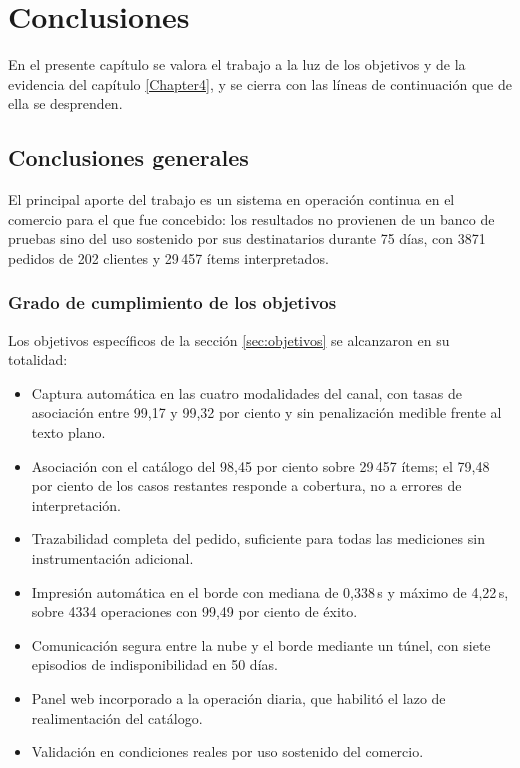 
\chapter{Conclusiones} %

\label{Chapter5}

En el presente capítulo se valora el trabajo a la luz de los objetivos y de la evidencia del capítulo \ref{Chapter4}, y se cierra con las líneas de continuación que de ella se desprenden.


\section{Conclusiones generales}

El principal aporte del trabajo es un sistema en operación continua en el comercio para el que fue concebido: los resultados no provienen de un banco de pruebas sino del uso sostenido por sus destinatarios durante 75 días, con 3871 pedidos de 202 clientes y 29\,457 ítems interpretados.

\subsection{Grado de cumplimiento de los objetivos}

Los objetivos específicos de la sección \ref{sec:objetivos} se alcanzaron en su totalidad:

\begin{itemize}
	\item Captura automática en las cuatro modalidades del canal, con tasas de asociación entre 99,17 y 99,32 por ciento y sin penalización medible frente al texto plano.
	\item Asociación con el catálogo del 98,45 por ciento sobre 29\,457 ítems; el 79,48 por ciento de los casos restantes responde a cobertura, no a errores de interpretación.
	\item Trazabilidad completa del pedido, suficiente para todas las mediciones sin instrumentación adicional.
	\item Impresión automática en el borde con mediana de 0,338\,s y máximo de 4,22\,s, sobre 4334 operaciones con 99,49 por ciento de éxito.
	\item Comunicación segura entre la nube y el borde mediante un túnel, con siete episodios de indisponibilidad en 50 días.
	\item Panel web incorporado a la operación diaria, que habilitó el lazo de realimentación del catálogo.
	\item Validación en condiciones reales por uso sostenido del comercio.
\end{itemize}


